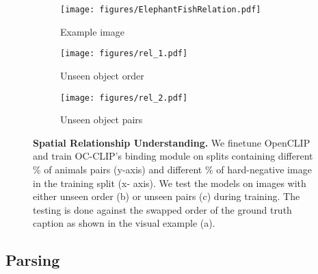 \begin{figure*}[ht]
\centering
    \begin{subfigure}[b]{0.33\textwidth}
        \centering    \texttt{[image: figures/ElephantFishRelation.pdf]}
        \caption{ Example image}
    \end{subfigure}%
    \hfill
    \begin{subfigure}[b]{0.33\textwidth}
        \centering    \texttt{[image: figures/rel\_1.pdf]}
        \caption{Unseen object order}
    \end{subfigure}%
    \begin{subfigure}[b]{0.33\textwidth}
        \centering    \texttt{[image: figures/rel\_2.pdf]}
        \caption{Unseen object pairs}
    \end{subfigure}

  \caption{\textbf{Spatial Relationship Understanding.} We finetune OpenCLIP and train OC-CLIP's binding module on splits containing different \% of animals pairs (y-axis) and different \% of hard-negative image in the training split (x- axis). We test the models on images with either unseen order (b) or unseen pairs (c) during training. The testing is done  against the swapped order of the ground truth caption as shown in the visual example (a).}
  \label{fig:rel_pug}
\end{figure*}

\subsection{Parsing}

